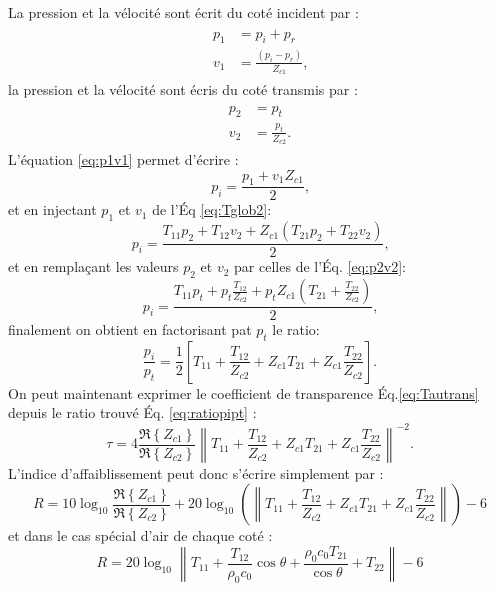 \documentclass[12pt,foolscap]{report}
\begin{document}
	La pression et la vélocité sont écrit du coté incident par :
	\begin{align}
	\begin{split}
	p_1&=p_i+p_r\\
	v_1&=\frac{(p_i-p_r)}{ Z_{c1}} \text{,}
	\label{eq:p1v1}
	\end{split}
	\end{align}
	la pression et la vélocité sont écris du coté transmis par :
	\begin{align}
	\begin{split}
	p_2&=p_t\\
	v_2&= \frac{p_t}{Z_{c2}}\text{.}
	\label{eq:p2v2}
	\end{split}
	\end{align}
	L'équation \ref{eq:p1v1} permet d'écrire : 
	\begin{equation}
	p_i = \frac{p_1 +v_1Z_{c1}}{2}\text{,}
	\end{equation}
	et en injectant $p_1$ et $v_1$ de l'Éq \ref{eq:Tglob2}:
	\begin{equation}
	p_i = \frac{T_{11}p_2+T_{12}v_2+Z_{c1}(T_{21}p_2+T_{22}v_2)}{2}\text{,}
	\end{equation}
	et en remplaçant les valeurs $p_2$ et $v_2$ par celles de l'Éq. \ref{eq:p2v2}:
	\begin{equation}
	p_i = \frac{T_{11}p_t+p_t\frac{T_{12}}{Z_{c2}}+p_tZ_{c1}(T_{21}+\frac{T_{22}}{Z_{c2}})}{2}\text{,}
	\end{equation}
	finalement on obtient en factorisant pat $p_t$ le ratio: 
	\begin{equation}
	\frac{p_i}{p_t} = \frac{1}{2} \left[T_{11}+\frac{T_{12}}{Z_{c2}}+Z_{c1}T_{21}+Z_{c1}\frac{T_{22}}{Z_{c2}}\right]\text{.}
	\label{eq:ratiopipt}
	\end{equation}
	On peut maintenant exprimer le coefficient de transparence Éq.\ref{eq:Tautrans} depuis le ratio trouvé Éq. \ref{eq:ratiopipt} : 
	\begin{equation}
	\tau =4  \frac{ \Re\left\lbrace Z_{c1} \right\rbrace}{\Re\left\lbrace Z_{c2}\right\rbrace} \left\|T_{11}+\frac{T_{12}}{Z_{c2}}+Z_{c1}T_{21}+Z_{c1}\frac{T_{22}}{Z_{c2}}\right\|^{-2}\text{.}
	\end{equation}
	L'indice d'affaiblissement peut donc s'écrire simplement par :
	\begin{equation}
	R = 10 \log_{10}\frac{ \Re\left\lbrace Z_{c1} \right\rbrace}{\Re\left\lbrace Z_{c2}\right\rbrace}+20 \log_{10}\left( \left\|T_{11}+\frac{T_{12}}{Z_{c2}}+Z_{c1}T_{21}+Z_{c1}\frac{T_{22}}{Z_{c2}}\right\|\right)-6
	\end{equation} 
	et dans le cas spécial d'air de chaque coté :
	\begin{equation}
	R = 20 \log_{10} \left\|T_{11}+\frac{T_{12}}{\rho_0 c_0}\cos\theta+\frac{\rho_0 c_0T_{21}}{\cos\theta}+T_{22}\right\|-6
	\end{equation}\\
	
\end{document}
